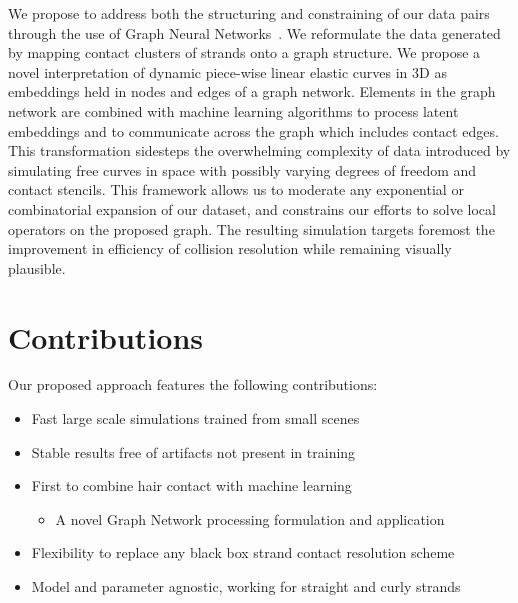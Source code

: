 \documentclass[12pt]{report}
\begin{document}
We propose to address both the structuring and constraining of
our data pairs through the use of Graph Neural
Networks~\cite{battaglia2018graphnetssummary, chang2016compositional, li2019learning, li2018propagation,  pfaff2021learning, sanchezgonzalez2018inferencecontrol, sanchezgonzalez2020learning, scarselli2009graphnets}.
We reformulate the data generated by mapping contact clusters of strands onto a graph structure.
We propose a novel interpretation of dynamic piece-wise linear elastic curves in 3D as embeddings held in nodes and edges of a graph network.
Elements in the graph network are combined with machine learning algorithms
to process latent embeddings and to communicate across the graph which includes contact edges.
This transformation sidesteps the overwhelming complexity of data introduced by simulating
free curves in space with possibly varying degrees of freedom and contact stencils.
This framework allows us to moderate any exponential or combinatorial expansion of our dataset,
and constrains our efforts to solve local operators on the proposed graph. 
The resulting simulation targets foremost the improvement in efficiency of collision
resolution while remaining visually plausible. 

\section{Contributions}\label{sec:hair_contributions}
Our proposed approach features the following contributions:
\begin{itemize}
    \item Fast large scale simulations trained from small scenes
    \item Stable results free of artifacts not present in training
    \item First to combine hair contact with machine learning
    \begin{itemize}
        \item A novel Graph Network processing formulation and application 
    \end{itemize}
    \item Flexibility to replace any black box strand contact resolution scheme
    \item Model and parameter agnostic, working for straight and curly strands
\end{itemize}
\end{document}
